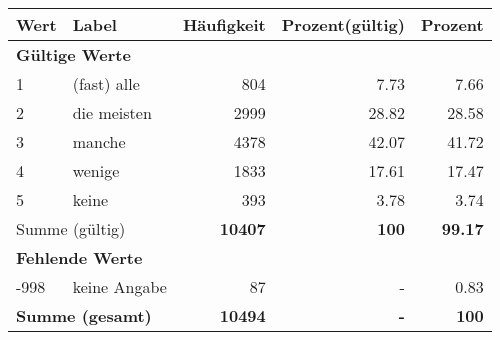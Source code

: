      \begin{longtable}{lXrrr}
     \toprule
     \textbf{Wert} & \textbf{Label} & \textbf{Häufigkeit} & \textbf{Prozent(gültig)} & \textbf{Prozent} \\
     \endhead
     \midrule
     \multicolumn{5}{l}{\textbf{Gültige Werte}}\\

     1 &
     \multicolumn{1}{X}{ (fast) alle   } &


       \num{804} &
       \num[round-mode=places,round-precision=2]{7.73} &
         \num[round-mode=places,round-precision=2]{7.66} \\

     2 &
     \multicolumn{1}{X}{ die meisten   } &


       \num{2999} &
       \num[round-mode=places,round-precision=2]{28.82} &
         \num[round-mode=places,round-precision=2]{28.58} \\

     3 &
     \multicolumn{1}{X}{ manche   } &


       \num{4378} &
       \num[round-mode=places,round-precision=2]{42.07} &
         \num[round-mode=places,round-precision=2]{41.72} \\

     4 &
     \multicolumn{1}{X}{ wenige   } &


       \num{1833} &
       \num[round-mode=places,round-precision=2]{17.61} &
         \num[round-mode=places,round-precision=2]{17.47} \\

     5 &
     \multicolumn{1}{X}{ keine   } &


       \num{393} &
       \num[round-mode=places,round-precision=2]{3.78} &
         \num[round-mode=places,round-precision=2]{3.74} \\
     \midrule
     \multicolumn{2}{l}{Summe (gültig)} &
       \textbf{\num{10407}} &
     \textbf{\num{100}} &
       \textbf{\num[round-mode=places,round-precision=2]{99.17}} \\
     \multicolumn{5}{l}{\textbf{Fehlende Werte}}\\
       -998 &
       keine Angabe &
         \num{87} &
        - &
         \num[round-mode=places,round-precision=2]{0.83} \\
     \midrule
     \multicolumn{2}{l}{\textbf{Summe (gesamt)}} &
          \textbf{\num{10494}} &
        \textbf{-} &
        \textbf{\num{100}} \\
     \bottomrule
     \end{longtable}
     
